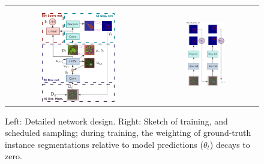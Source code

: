 \begin{figure}
\begin{center}
\begin{tabular}{cc}
\includegraphics[width=0.52\textwidth]{./figs/model_arch.png} &
\includegraphics[width=0.38\textwidth]{./figs/model_arch2.png}
\end{tabular}
\end{center}
\caption{
Left: Detailed network design.
Right: Sketch of training, and scheduled sampling;
during training, the weighting of
ground-truth instance segmentations
relative to model predictions
($\theta_t$) decays to zero.
}
\label{fig:model_arch}
\end{figure}
